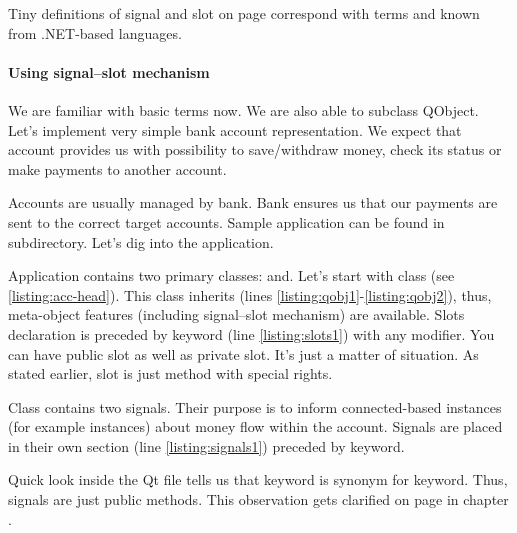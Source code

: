 \begin{fdocextra}
Tiny definitions of signal and slot on page \pageref{desc:sig} correspond with terms  and  known from .NET-based languages. \citep[p.~200-202]{nigel:csharp}
\end{fdocextra}

\paragraph{Using signal--slot mechanism}
We are familiar with basic terms now. We are also able to subclass QObject. Let's implement very simple bank account representation. We expect that account provides us with possibility to save/withdraw money, check its status or make payments to another account.

Accounts are usually managed by bank. Bank ensures us that our payments are sent to the correct target accounts. Sample application can be found in subdirectory. Let's dig into the application.

Application contains two primary classes: and. Let's start with class (see \autoref{listing:acc-head}). This class inherits (lines \ref{listing:qobj1}-\ref{listing:qobj2}), thus, meta-object features (including signal--slot mechanism) are available. Slots declaration is preceded by keyword (line \ref{listing:slots1}) with any modifier. You can have public slot as well as private slot. It's just a matter of situation. As stated earlier, slot is just method with special rights.

Class  contains two signals. Their purpose is to inform connected-based instances (for example instances) about money flow within the account. Signals are placed in their own section (line \ref{listing:signals1}) preceded by keyword.

\begin{fdocextra}
Quick look inside the Qt file tells us that keyword is synonym for keyword. Thus, signals are just public methods. This observation gets clarified on page \pageref{section:mocfun} in chapter .
\end{fdocextra}

